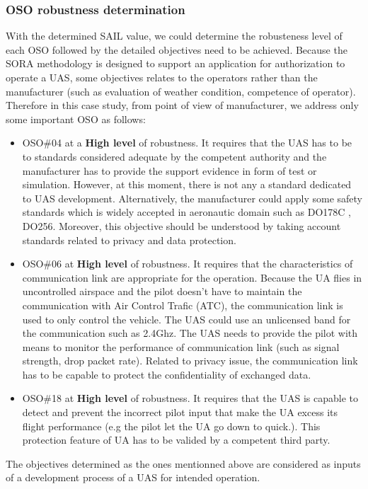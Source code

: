 \documentclass[a4paper, 10, conference]{ieeeconf}  %
\begin{document}
\subsubsection{OSO robustness determination} With the determined SAIL value, we could determine the robusteness level of each OSO followed by the detailed objectives need to be achieved. Because the SORA methodology is designed to support an application for authorization to operate a UAS, some objectives relates to the operators rather than the manufacturer (such as evaluation of weather condition, competence of operator). Therefore in this case study, from point of view of manufacturer, we address only some important OSO as follows:
\begin{itemize}
	\item OSO\#04 at a \textbf{High level} of robustness. It requires that the UAS has to be to standards considered adequate by the competent authority and the manufacturer has to provide the support evidence in form of test or simulation. However, at this moment, there is not any a standard dedicated to UAS development. Alternatively, the manufacturer could apply some safety standards which is widely accepted in aeronautic domain such as DO178C , DO256. Moreover, this objective should be understood by taking account standards related to privacy and data protection.
	
	\item OSO\#06 at \textbf{High level} of robustness. It requires that the characteristics of communication link are appropriate for the operation. Because the UA flies in uncontrolled airspace and the pilot doesn't have to maintain the communication with Air Control Trafic (ATC), the communication link is used to only control the vehicle. The UAS could use an unlicensed band for the communication such as 2.4Ghz. The UAS needs to provide the pilot with means to monitor the performance of communication link (such as signal strength, drop packet rate). Related to privacy issue, the communication link has to be capable to protect the confidentiality of exchanged data.
	
	
	\item OSO\#18 at \textbf{High level} of robustness. It requires that the UAS is capable to detect and prevent the incorrect pilot input that make the UA excess its flight performance (e.g the pilot let the UA go down to quick.). This protection feature of UA has to be valided by a competent third party. 
\end{itemize}
The objectives determined as the ones mentionned above are considered as inputs of a development process of a UAS for intended operation.
\end{document}
